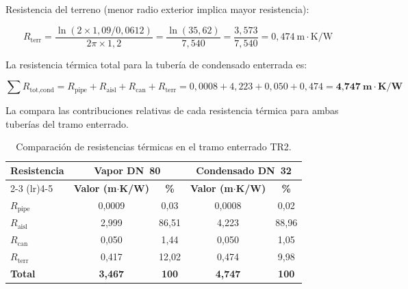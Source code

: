 \documentclass[12pt]{article}
\begin{document}
Resistencia del terreno (menor radio exterior implica mayor resistencia):

\begin{equation}
	R_{\text{terr}} = \frac{\ln(2 \times 1{,}09 / 0{,}0612)}{2\pi \times 1{,}2} = \frac{\ln(35{,}62)}{7{,}540} = \frac{3{,}573}{7{,}540} = 0{,}474~\text{m}\cdot\text{K/W}
	\label{eq:resist_terr_TR2_cond}
\end{equation}

La resistencia térmica total para la tubería de condensado enterrada es:

\begin{equation}
	\sum R_{\text{tot,cond}} = R_{\text{pipe}} + R_{\text{aisl}} + R_{\text{can}} + R_{\text{terr}} = 0{,}0008 + 4{,}223 + 0{,}050 + 0{,}474 = \textbf{4{,}747}~\textbf{m}\cdot\textbf{K/W}
	\label{eq:resist_total_TR2_cond}
\end{equation}

La  compara las contribuciones relativas de cada resistencia térmica para ambas tuberías del tramo enterrado.

\begin{table}[htbp]
	\centering
	\caption{Comparación de resistencias térmicas en el tramo enterrado TR2.}
	\label{tab:resistencias_TR2}
	\begin{tabular}{lcccc}
		\toprule
		\textbf{Resistencia} & \multicolumn{2}{c}{\textbf{Vapor DN~80}} & \multicolumn{2}{c}{\textbf{Condensado DN~32}}                                               \\
		\cmidrule(lr){2-3} \cmidrule(lr){4-5}
		                     & \textbf{Valor (m$\cdot$K/W)}             & \textbf{\%}                                   & \textbf{Valor (m$\cdot$K/W)} & \textbf{\%}  \\
		\midrule
		$R_{\text{pipe}}$    & 0{,}0009                                 & 0{,}03                                        & 0{,}0008                     & 0{,}02       \\
		$R_{\text{aisl}}$    & 2{,}999                                  & 86{,}51                                       & 4{,}223                      & 88{,}96      \\
		$R_{\text{can}}$     & 0{,}050                                  & 1{,}44                                        & 0{,}050                      & 1{,}05       \\
		$R_{\text{terr}}$    & 0{,}417                                  & 12{,}02                                       & 0{,}474                      & 9{,}98       \\
		\midrule
		\textbf{Total}       & \textbf{3{,}467}                         & \textbf{100}                                  & \textbf{4{,}747}             & \textbf{100} \\
		\bottomrule
	\end{tabular}
\end{table}
\end{document}
